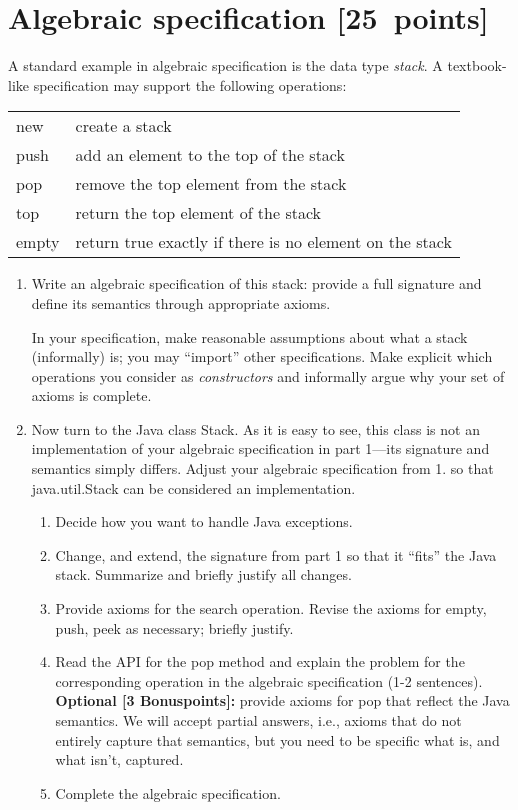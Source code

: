 \documentclass{article}
\begin{document}
\section{Algebraic specification [25~points]}

A standard example in algebraic specification is the data type \textit{stack}.
A textbook-like specification may support the following operations:
\begin{center}
\begin{tabular}[t]{ll}
 new & create a stack \\
 push & add an element to the top of the stack \\
 pop  & remove the top element from the stack \\
 top &  return the top element of the stack \\
 empty & return true exactly if there is no element on the stack
\end{tabular}
\end{center}


\begin{enumerate}
\item Write an algebraic specification of this stack: provide a full signature
and define its semantics through appropriate axioms. 

In your specification,
make reasonable assumptions about what a stack (informally) is; you
may ``import'' other specifications. Make explicit which operations
you consider as \textit{constructors} and informally argue why your
set of axioms is complete.
\item Now turn to the Java class \textsf{Stack}. As it is easy to see,
this class is not an implementation of your algebraic specification 
in part 1---its signature and semantics simply differs. 
Adjust your algebraic specification from 1. so that \textsf{java.util.Stack}
can be considered an implementation.

\begin{enumerate}
\item Decide how you want to handle Java exceptions.
\item Change, and extend, the signature from part 1 so that it ``fits''
the Java stack. Summarize and briefly justify all changes.
\item Provide axioms for the \textsf{search} operation. Revise the
axioms for \textsf{empty, push, peek} as necessary; briefly justify.
\item  Read the API for the \textsf{pop} method and explain the problem
for the corresponding operation in the algebraic specification 
(1-2 sentences).\\
 \textbf{Optional [3 Bonuspoints]:} provide axioms for \textsf{pop} that reflect the
Java semantics. We will accept partial answers, i.e., axioms that 
do not entirely capture that semantics, but you need to be specific
what is, and what isn't, captured. 

\item Complete the algebraic specification. 
\end{enumerate}
\end{enumerate}
\end{document}
